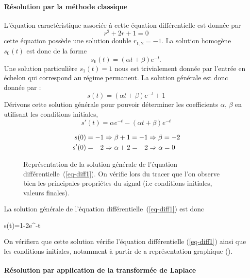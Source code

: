 \paragraph{Résolution par la méthode \og classique\fg}
L'équation caractéristique associée à cette équation différentielle est donnée par 
$$
r^2+2r+1=0
$$
cette équation possède une solution double $r_{1,2}=-1$.
La solution homogène $s_0(t)$ est donc de la forme
$$
s_0(t)=(\alpha t+\beta)e^{-t}.
$$
Une solution particulière $s_1(t)=1$ nous est trivialement donnée par l'entrée en échelon qui correspond au 
régime permanent.
La solution générale est donc donnée par :
$$
s(t)=(\alpha t+\beta)e^{-t}+1
$$
Dérivons cette solution générale pour pouvoir déterminer les coefficients $\alpha$, $\beta$ en utilisant
les conditions initiales,
$$
s'(t)=\alpha e^{-t}-(\alpha t+\beta)e^{-t}
$$

\begin{align*}
     s(0)&=-1\Rightarrow\beta+1=-1\Rightarrow\beta=-2 \\
    s'(0)&=\hphantom{-}2\Rightarrow\alpha+2=\hphantom{-}2\Rightarrow\alpha=0
\end{align*}

\begin{figure}[!t]
    \centering
{}

    \caption{Représentation de la solution générale de l'équation différentielle~(\ref{eq-diff1}). On vérifie lors 
	du tracer que l'on observe bien les principales propriétes du signal (i.e conditions initiales, valeurs finales).\label{fig-solution}}
\end{figure}

La solution générale de l'équation différentielle~(\ref{eq-diff1}) est donc 
\begin{bequation}
s(t)=1-2e^{-t}
\end{bequation}
On vérifiera que cette solution vérifie l'équation différentielle (\ref{eq-diff1}) ainsi que les conditions initiales, notamment à partir 
de a représentation graphique ().

\paragraph{Résolution par application de la transformée de Laplace}


